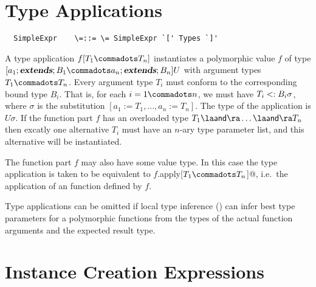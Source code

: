\documentclass[11pt]{report}
\begin{document}
\begin{itemize}

\section{Type Applications}
\label{sec:type-app}
\syntax\begin{verbatim}
  SimpleExpr    \=::= \= SimpleExpr `[' Types `]'
\end{verbatim}

A type application $f[T_1\commadots T_n]$ instantiates a polymorphic
value $f$ of type $[a_1 \extends B_1 \commadots a_n \extends B_n] U$ with
argument types $T_1 \commadots T_n$.  Every argument type $T_i$ must
conform to the corresponding bound type $B_i$. That is, for each $i = 1
\commadots n$, we must have $T_i <: B_i\sigma$, where $\sigma$ is
the substitution $[a_1 := T_1, ..., a_n := T_n]$.  The type of the
application is $U\sigma$.  If the function part $f$ has an overloaded
type $T_1 \overload \ldots \overload T_n$ then excatly one alternative
$T_i$ must have an $n$-ary type parameter list, and this alternative
will be instantiated.

The function part $f$ may also have some value type. In this case the
type application is taken to be equivalent to
\verb@$f$.apply[$T_1\commadots T_n$]@,
i.e.\ the application of an \verb@apply@ function defined by $f$.

Type applications can be omitted if local type inference
() can infer best type parameters for a
polymorphic functions from the types of the actual function arguments
and the expected result type.

\section{Instance Creation Expressions}
\label{sec:inst-creation}


\end{itemize}
\end{document}
